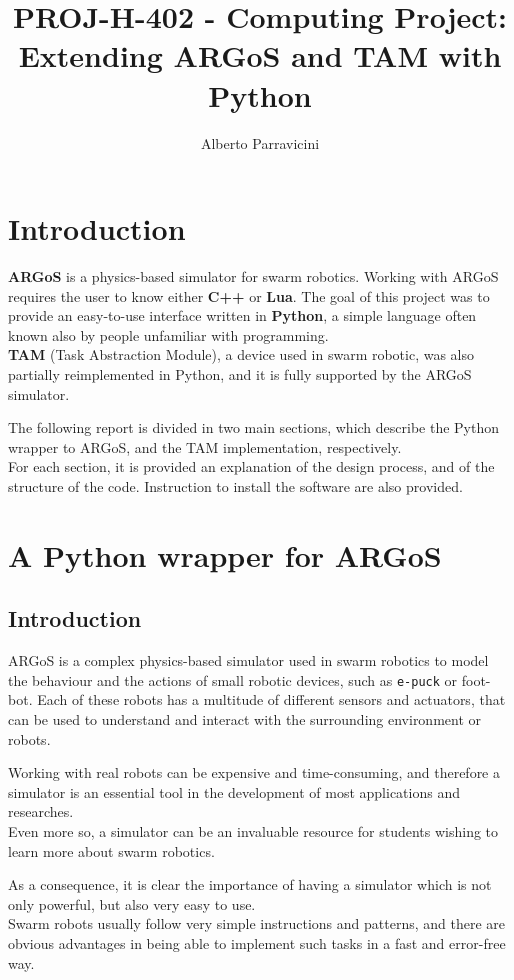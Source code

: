 \documentclass[
12pt,
a4paper,
oneside,
headinclude,
footinclude]{article}
\title{\textbf{PROJ-H-402 - Computing Project: \\ Extending ARGoS and TAM with Python}}
\author{{Alberto Parravicini}}
\date{}	%
\theoremstyle{definition} %
\begin{document}
\maketitle
{}
\setcounter{page}{1}

\section{Introduction}
\textbf{ARGoS} is a physics-based simulator for swarm robotics. Working with ARGoS requires the user to know either \textbf{C++} or \textbf{Lua}. The goal of this project was to provide an easy-to-use interface written in \textbf{Python}, a simple language often known also by people unfamiliar with programming.\\
\textbf{TAM} (Task Abstraction Module), a device used in swarm robotic, was also partially reimplemented in Python, and it is fully supported by the ARGoS simulator.

The following report is divided in two main sections, which describe the Python wrapper to ARGoS, and the TAM implementation, respectively. \\
For each section, it is provided an explanation of the design process, and of the structure of the code. Instruction to install the software are also provided.

\newpage

\section{A Python wrapper for ARGoS}

\subsection{Introduction}
ARGoS is a complex physics-based simulator used in swarm robotics to model the behaviour and the actions of small robotic devices, such as \texttt{e-puck} or {foot-bot}. Each of these robots has a multitude of different sensors and actuators, that can be used to understand and interact with the surrounding environment or robots.

Working with real robots can be expensive and time-consuming, and therefore a simulator is an essential tool in the development of most applications and researches. \\
Even more so, a simulator can be an invaluable resource for students wishing to learn more about swarm robotics.

As a consequence, it is clear the importance of having a simulator which is not only powerful, but also very easy to use.\\
Swarm robots usually follow very simple instructions and patterns, and there are obvious advantages in being able to implement such tasks in a fast and error-free way.
\end{document}
